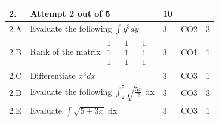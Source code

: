 \documentclass[12pt]{article}
\begin{document}
	\begin{longtable}{|L{1cm}|L{8cm}|C{1cm}|C{1cm}|C{1cm}|}\hline
	\bf2. & \bf{Attempt} \bf{2} \bf{out of} \bf{5} & \bf{10}  & & \\ \hline





		2.A &
	Evaluate the following $\int y^{3} dy$ \newline
			
	 &  3 & CO2 & 3\\ \hline
		2.B &
	Rank of the matrix  $\begin{matrix} 1 && 1 &&1 \\ 1 && 1 && 1\\ 1 && 1 && 1 \end{matrix}$ \newline
			
	 &  3 & CO1 & 1\\ \hline
		2.C &
	Differentiate $x^{3}dx$ \newline
			
	 &  3 & CO3 & 1\\ \hline
		2.D &
	Evaluate the following $\int_{2}^{5}\sqrt{\frac{5x}{2}}$ dx \newline
			
	 &  3 & CO3 & 3\\ \hline
		2.E &
	Evaluate $\int \sqrt{5+3x}$ dx \newline
			
	 &  3 & CO3 & 1\\ \hline
	\end{longtable}
\end{document}
